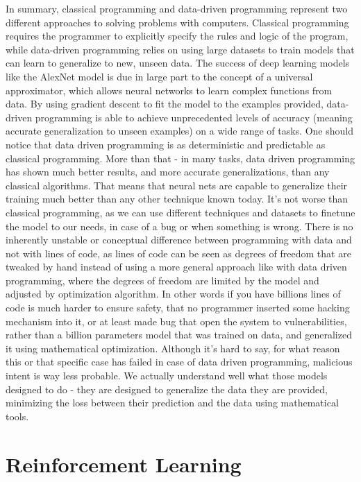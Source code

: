 \documentclass{article}
\begin{document}
In summary, classical programming and data-driven programming represent two different approaches to solving problems with computers. Classical programming requires the programmer to explicitly specify the rules and logic of the program, while data-driven programming relies on using large datasets to train models that can learn to generalize to new, unseen data. The success of deep learning models like the AlexNet model is due in large part to the concept of a universal approximator, which allows neural networks to learn complex functions from data. By using gradient descent to fit the model to the examples provided, data-driven programming is able to achieve unprecedented levels of accuracy (meaning accurate generalization to unseen examples) on a wide range of tasks. One should notice that data driven programming is as deterministic and predictable as classical programming. More than that - in many tasks, data driven programming has shown much better results, and more accurate generalizations, than any classical algorithms. That means that neural nets are capable to generalize their training much better than any other technique known today. It's not worse than classical programming, as we can use different techniques and datasets to finetune the model to our needs, in case of a bug or when something is wrong. There is no inherently unstable or conceptual difference between programming with data and not with lines of code, as lines of code can be seen as degrees of freedom that are tweaked by hand instead of using a more general approach like with data driven programming, where the degrees of freedom are limited by the model and adjusted by optimization algorithm. In other words if you have billions lines of code is much harder to ensure safety, that no programmer inserted some hacking mechanism into it, or at least made bug that open the system to vulnerabilities, rather than a billion parameters model that was trained on data, and generalized it using mathematical optimization. Although it's hard to say, for what reason this or that specific case has failed in case of data driven programming, malicious intent is way less probable. We actually understand well what those models designed to do - they are designed to generalize the data they are provided, minimizing the loss between their prediction and the data using mathematical tools. \\

\section{Reinforcement Learning}
\end{document}
